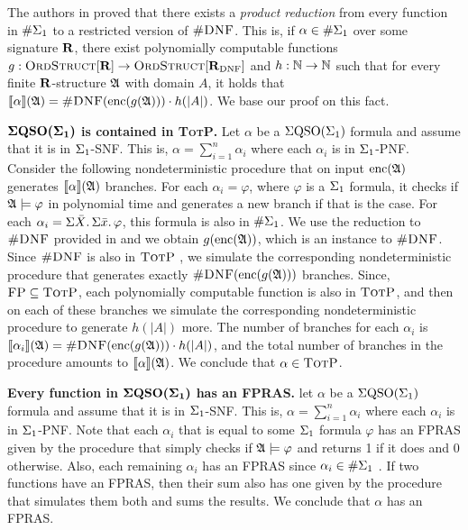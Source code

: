 The authors in \cite{SalujaST95} proved that there exists a {\em product reduction} from every function in $\#\Sigma_{1}$ to a restricted version of $\textsc{\#DNF}$. This is, if $\alpha\in\#\Sigma_{1}$ over some signature $\mathbf{R}$, there exist polynomially computable functions $g:\text{\sc OrdStruct}[\mathbf{R}]\to\text{\sc OrdStruct}[\mathbf{R}_{\text{DNF}}]$ and $h:\mathbb{N}\to\mathbb{N}$ such that for every finite $\mathbf{R}$-structure $\mathfrak{A}$ with domain $A$, it holds that ${\llbracket{}{\alpha}\rrbracket}(\mathfrak{A}) = \textsc{\#DNF}({\rm enc}(g(\mathfrak{A})))\cdot h(\vert A \vert)$. We base our proof on this fact.

\vspace{1em}
$\boldsymbol{\Sigma{\rm QSO}(\Sigma_{1})}$ {\bf is contained in \textsc{TotP}.} Let $\alpha$ be a $\Sigma{\rm QSO}(\Sigma_{1})$ formula and assume that it is in $\Sigma_{1}$-SNF. This is, $\alpha = \sum_{i = 1}^n\alpha_i$ where each $\alpha_i$ is in $\Sigma_{1}$-PNF. Consider the following nondeterministic procedure that on input ${\rm enc}(\mathfrak{A})$ generates ${\llbracket{}{\alpha}\rrbracket}(\mathfrak{A})$ branches. For each $\alpha_i = \varphi$, where $\varphi$ is a $\Sigma_{1}$ formula, it checks if $\mathfrak{A}\models\varphi$ in polynomial time and generates a new branch if that is the case. For each $\alpha_i = \Sigma{\bar{X}}.\,\Sigma{\bar{x}}.\,\varphi$, this formula is also in $\#\Sigma_{1}$. We use the reduction to $\textsc{\#DNF}$ provided in \cite{SalujaST95} and we obtain $g({\rm enc}(\mathfrak{A}))$, which is an instance to $\textsc{\#DNF}$. Since $\textsc{\#DNF}$ is also in $\text{\sc TotP}$ \cite{PagourtzisZ06}, we simulate the corresponding nondeterministic procedure that generates exactly $\textsc{\#DNF}({\rm enc}(g(\mathfrak{A})))$ branches. Since, $\text{\sc FP}\subseteq\text{\sc TotP}$\cite{PagourtzisZ06}, each polynomially computable function is also in $\text{\sc TotP}$, and then on each of these branches we simulate the corresponding nondeterministic procedure to generate $h(\vert A \vert)$ more. The number of branches for each $\alpha_i$ is ${\llbracket{}{\alpha_i}\rrbracket}(\mathfrak{A}) = \textsc{\#DNF}({\rm enc}(g(\mathfrak{A})))\cdot h(\vert A \vert)$, and the total number of branches in the procedure amounts to ${\llbracket{}{\alpha}\rrbracket}(\mathfrak{A})$. We conclude that $\alpha\in\text{\sc TotP}$.

\vspace{1em}
{\bf Every function in} $\boldsymbol{\Sigma{\rm QSO}(\Sigma_{1})}$ {\bf has an FPRAS.}  let $\alpha$ be a $\Sigma{\rm QSO}(\Sigma_{1})$ formula and assume that it is in $\Sigma_{1}$-SNF. This is, $\alpha = \sum_{i = 1}^n\alpha_i$ where each $\alpha_i$ is in $\Sigma_{1}$-PNF. Note that each $\alpha_i$ that is equal to some $\Sigma_{1}$ formula $\varphi$ has an FPRAS given by the procedure that simply checks if $\mathfrak{A}\models\varphi$ and returns 1 if it does and 0 otherwise. Also, each remaining $\alpha_i$ has an FPRAS since $\alpha_i\in \#\Sigma_{1}$ \cite{SalujaST95}. If two functions have an FPRAS, then their sum also has one given by the procedure that simulates them both and sums the results. We conclude that $\alpha$ has an FPRAS.

